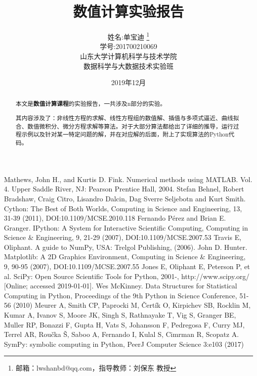 \documentclass{elegantpaper}
\title{\Huge 数值计算实验报告}
\author{\Large 姓名:单宝迪 \thanks{邮箱：lwshanbd@qq.com，指导教师：刘保东 教授} \\ \Large 学号:201700210069 \\%
		山东大学计算机科学与技术学院\\ 数据科学与大数据技术实验班}
\date{2019年12月}
\begin{document}
\maketitle



\begin{abstract}
	本文是\textbf{数值计算课程}的实验报告，一共涉及n部分的实验。
	
	其内容涉及了：非线性方程的求解、线性方程组的数值解、插值与多项式逼近、曲线拟合、数值微积分、微分方程求解等算法。对于大部分算法都给出了详细的推导，运行过程示例以及针对某一特定问题的解，并在对应解的后面，附上了实现算法的Python代码。
	

\end{abstract}



\newpage
\tableofcontents
\newpage













\begin{thebibliography}{99}
	 Mathews, John H., and Kurtis D. Fink. Numerical methods using MATLAB. Vol. 4. Upper Saddle River, NJ: Pearson Prentice Hall, 2004.
	Stefan Behnel, Robert Bradshaw, Craig Citro, Lisandro Dalcin, Dag Sverre Seljebotn and Kurt Smith. Cython: The Best of Both Worlds, Computing in Science and Engineering, 13, 31-39 (2011), DOI:10.1109/MCSE.2010.118
	Fernando Pérez and Brian E. Granger. IPython: A System for Interactive Scientific Computing, Computing in Science \& Engineering, 9, 21-29 (2007), DOI:10.1109/MCSE.2007.53
	Travis E, Oliphant. A guide to NumPy, USA: Trelgol Publishing, (2006).
	John D. Hunter. Matplotlib: A 2D Graphics Environment, Computing in Science \& Engineering, 9, 90-95 (2007), DOI:10.1109/MCSE.2007.55
	Jones E, Oliphant E, Peterson P, et al. SciPy: Open Source Scientific Tools for Python, 2001-, http://www.scipy.org/ [Online; accessed 2019-01-01].
	Wes McKinney. Data Structures for Statistical Computing in Python, Proceedings of the 9th Python in Science Conference, 51-56 (2010)
	Meurer A, Smith CP, Paprocki M, Čertík O, Kirpichev SB, Rocklin M, Kumar A, Ivanov S, Moore JK, Singh S, Rathnayake T, Vig S, Granger BE, Muller RP, Bonazzi F, Gupta H, Vats S, Johansson F, Pedregosa F, Curry MJ, Terrel AR, Roučka Š, Saboo A, Fernando I, Kulal S, Cimrman R, Scopatz A. SymPy: symbolic computing in Python, PeerJ Computer Science 3:e103 (2017)
\end{thebibliography}
\end{document}
